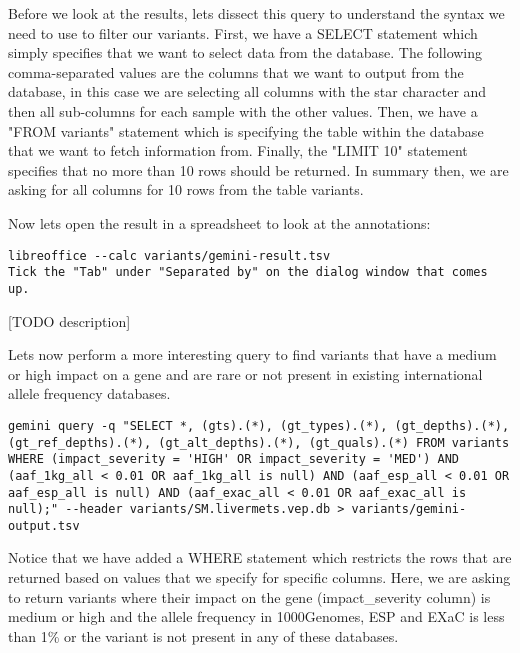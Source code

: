 Before we look at the results, lets dissect this query to understand the syntax we need to use to filter our variants. First, we have a SELECT statement which simply specifies that we want to select data from the database. The following comma-separated values are the columns that we want to output from the database, in this case we are selecting all columns with the star character and then all sub-columns for each sample with the other values. Then, we have a "FROM variants" statement which is specifying the table within the database that we want to fetch information from. Finally, the "LIMIT 10" statement specifies that no more than 10 rows should be returned. In summary then, we are asking for all columns for 10 rows from the table variants.

\begin{steps}
Now lets open the result in a spreadsheet to look at the annotations:
\begin{lstlisting}
libreoffice --calc variants/gemini-result.tsv
Tick the "Tab" under "Separated by" on the dialog window that comes up.
\end{lstlisting}
\end{steps}

[TODO description]

Lets now perform a more interesting query to find variants that have a medium or high impact on a gene and are rare or not present in existing international allele frequency databases.

\begin{steps}
\begin{lstlisting}
gemini query -q "SELECT *, (gts).(*), (gt_types).(*), (gt_depths).(*), (gt_ref_depths).(*), (gt_alt_depths).(*), (gt_quals).(*) FROM variants WHERE (impact_severity = 'HIGH' OR impact_severity = 'MED') AND (aaf_1kg_all < 0.01 OR aaf_1kg_all is null) AND (aaf_esp_all < 0.01 OR aaf_esp_all is null) AND (aaf_exac_all < 0.01 OR aaf_exac_all is null);" --header variants/SM.livermets.vep.db > variants/gemini-output.tsv
\end{lstlisting}
\end{steps}

Notice that we have added a WHERE statement which restricts the rows that are returned based on values that we specify for specific columns. Here, we are asking to return variants where their impact on the gene (impact\_severity column) is medium or high and the allele frequency in 1000Genomes, ESP and EXaC is less than 1\% or the variant is not present in any of these databases.

